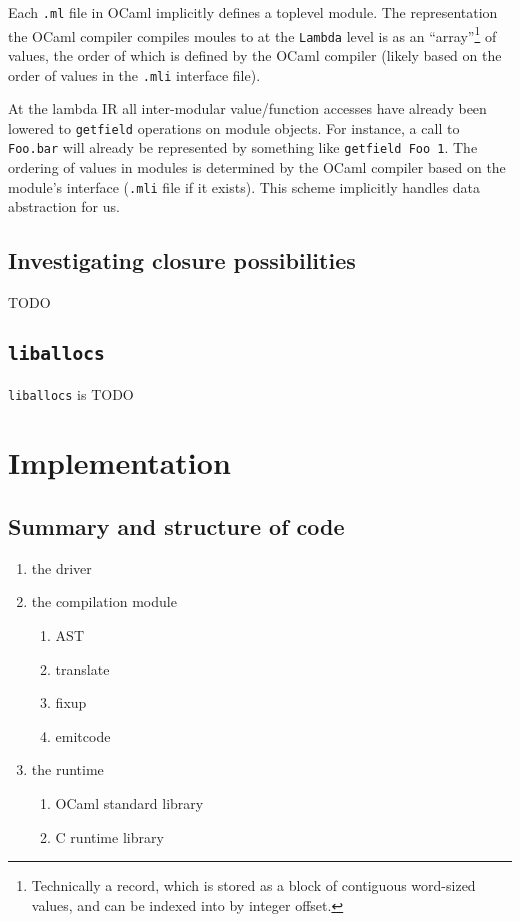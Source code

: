 \documentclass[12pt,a4paper,twoside,openright]{report}
\begin{document}
Each \lstinline!.ml! file in OCaml implicitly defines a toplevel module. The
representation the OCaml compiler compiles moules to at the \lstinline!Lambda!
level is as an ``array''\footnote{Technically a record, which is stored as a
block of contiguous word-sized values, and can be indexed into by integer
offset.} of values, the order of which is defined by the OCaml compiler (likely
based on the order of values in the \texttt{.mli} interface file).

At the lambda IR all inter-modular value/function accesses have already been
lowered to \lstinline!getfield! operations on module objects. For instance, a
call to \lstinline!Foo.bar! will already be represented by something like
\lstinline!getfield Foo 1!. The ordering of values in modules is determined by
the OCaml compiler based on the module's interface (\lstinline!.mli! file if it
exists). This scheme implicitly handles data abstraction for us.

\section{Investigating closure possibilities}

TODO

\section{\texttt{liballocs}}

\lstinline!liballocs! is TODO


\chapter{Implementation}

\section{Summary and structure of code}

\begin{enumerate}
  \item the driver
  \item the compilation module
    \begin{enumerate}
      \item AST
      \item translate
      \item fixup
      \item emitcode
    \end{enumerate}
  \item the runtime
    \begin{enumerate}
      \item OCaml standard library
      \item C runtime library
    \end{enumerate}
\end{enumerate}
\end{document}

